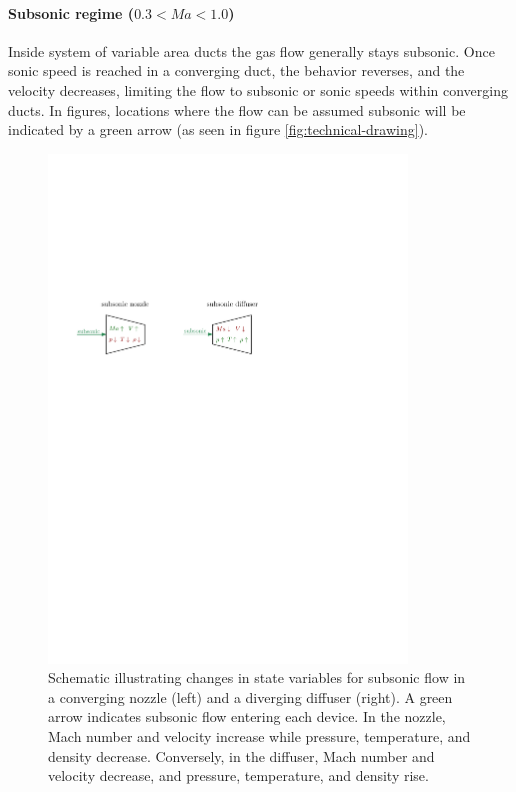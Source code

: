 	\paragraph{Subsonic regime ($0.3 < Ma < 1.0$)} 
		Inside system of variable area ducts the gas flow generally stays subsonic.
		Once sonic speed is reached in a converging duct, the behavior reverses, and the velocity decreases, limiting the flow to subsonic or sonic speeds within converging ducts.
		In figures, locations where the flow can be assumed subsonic will be indicated by a green arrow (as seen in figure \ref{fig:technical-drawing}).\\
		\begin{figure}[H]
		    \centering
		    \includegraphics[width=0.85\textwidth]{src/02_foundations/fig_variable-change-subsonic.pdf}
			\caption{
				Schematic illustrating changes in state variables for subsonic flow in a 
			    converging nozzle (left) and a diverging diffuser (right).
				A green arrow indicates subsonic flow entering each device.
				In the nozzle, Mach number and velocity increase while pressure, temperature, and density decrease.
				Conversely, in the diffuser, Mach number and velocity decrease, and pressure, temperature, and density rise.
				\cite{Cengel2017}
			}
		\end{figure}


